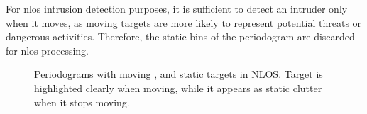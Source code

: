 	For \gls{nlos} intrusion detection purposes, it is sufficient to detect an intruder only when it moves, as moving targets are more likely to represent potential threats or dangerous activities. 
	Therefore, the static bins of the periodogram are discarded for \gls{nlos} processing.
	\begin{figure}[H]
		\centering
		
		\hfill
		
		\caption[]{Periodograms with moving , and static  targets in NLOS.
			Target is highlighted clearly when moving, while it appears as static clutter when it stops moving.}
		\label{fig:Rad_clutter_comparison}
	\end{figure}
	
